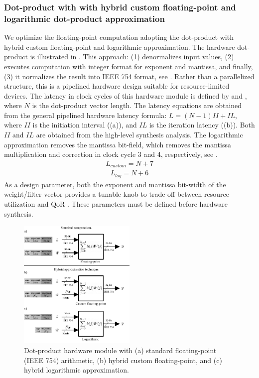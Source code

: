 \subsubsection{\textbf{Dot-product with with hybrid custom
		floating-point and logarithmic
		dot-product approximation}}
\label{sec:dot_product}
We optimize the floating-point computation adopting the dot-product with hybrid custom floating-point and logarithmic approximation\cite{nevarez2021accelerating}. The hardware dot-product is illustrated in . This approach: (1) denormalizes input values, (2) executes computation with integer format for exponent and mantissa, and finally, (3) it normalizes the result into IEEE 754 format, see . Rather than a parallelized structure, this is a pipelined hardware design suitable for resource-limited devices. The latency in clock cycles of this hardware module is defined by  and , where $N$ is the dot-product vector length. The latency equations are obtained from the general pipelined hardware latency formula: $L=\left(N-1\right)II+IL$, where $II$ is the initiation interval ((a)), and $IL$ is the iteration latency ((b)). Both $II$ and $IL$ are obtained from the high-level synthesis analysis. The logarithmic approximation removes the mantissa bit-field, which removes the mantissa multiplication and correction in clock cycle 3 and 4, respectively, see .
\begin{eqnarray} \label{eq:dot_custom_float_latency}
L_{custom}=N+7
\end{eqnarray}
\begin{eqnarray} \label{eq:dot_log_latency}
L_{log}=N+6
\end{eqnarray}
 As a design parameter, both the exponent and mantissa bit-width of the weight/filter vector provides a tunable knob to trade-off between resource utilization and QoR \cite{park2009dynamic}. These parameters must be defined before hardware synthesis.
\begin{figure}[t!]
	\centering
	\includegraphics[width=0.5\textwidth]{../figures/dot-product_unit.pdf}
	\caption{Dot-product hardware module with (a) standard floating-point
		(IEEE 754) arithmetic, (b) hybrid custom floating-point, and (c) hybrid logarithmic approximation.}
	\label{fig:dot_product}
\end{figure}
